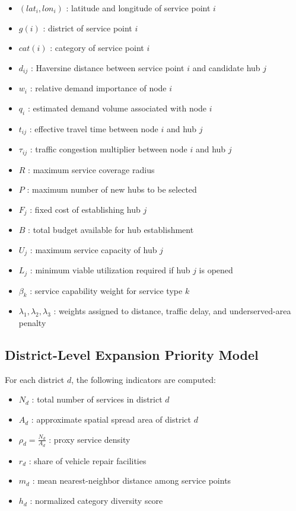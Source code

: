 \begin{itemize}
    \item $(lat_i, lon_i)$ : latitude and longitude of service point $i$
    \item $g(i)$ : district of service point $i$
    \item $cat(i)$ : category of service point $i$
    \item $d_{ij}$ : Haversine distance between service point $i$ and candidate hub $j$
    \item $w_i$ : relative demand importance of node $i$
    \item $q_i$ : estimated demand volume associated with node $i$
    \item $t_{ij}$ : effective travel time between node $i$ and hub $j$
    \item $\tau_{ij}$ : traffic congestion multiplier between node $i$ and hub $j$
    \item $R$ : maximum service coverage radius
    \item $P$ : maximum number of new hubs to be selected
    \item $F_j$ : fixed cost of establishing hub $j$
    \item $B$ : total budget available for hub establishment
    \item $U_j$ : maximum service capacity of hub $j$
    \item $L_j$ : minimum viable utilization required if hub $j$ is opened
    \item $\beta_k$ : service capability weight for service type $k$
    \item $\lambda_1, \lambda_2, \lambda_3$ : weights assigned to distance, traffic delay, and underserved-area penalty
\end{itemize}

\subsection{District-Level Expansion Priority Model}

For each district $d$, the following indicators are computed:
\begin{itemize}
    \item $N_d$ : total number of services in district $d$
    \item $A_d$ : approximate spatial spread area of district $d$
    \item $\rho_d = \frac{N_d}{A_d}$ : proxy service density
    \item $r_d$ : share of vehicle repair facilities
    \item $m_d$ : mean nearest-neighbor distance among service points
    \item $h_d$ : normalized category diversity score
\end{itemize}

